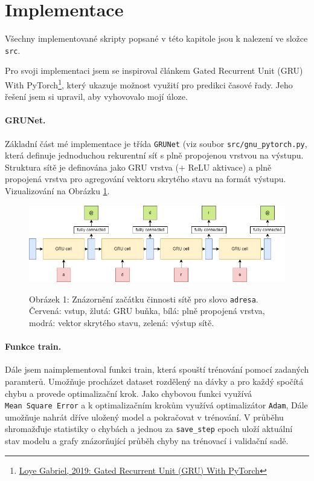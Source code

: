 \documentclass[a4paper]{article}
\theoremstyle{definition}
\begin{document}
\section{Implementace}
Všechny implementované skripty popsané v této kapitole jsou k nalezení ve složce \texttt{src}.

Pro svoji implementaci jsem se inspiroval článkem Gated Recurrent Unit (GRU) With PyTorch\footnote{\href{https://blog.floydhub.com/gru-with-pytorch/}{Loye Gabriel, 2019: Gated Recurrent Unit (GRU) With PyTorch}}, který ukazuje možnost využití pro predikci časové řady. Jeho řešení jsem si upravil, aby vyhovovalo mojí úloze.

\paragraph{GRUNet.}
Základní část mé implementace je třída \texttt{GRUNet} (viz soubor \texttt{src/gnu\_pytorch.py}, která definuje jednoduchou rekurentní síť s plně propojenou vrstvou na výstupu. Struktura sítě je definována jako GRU vrstva (+ ReLU aktivace) a plně propojená vrstva pro agregování vektoru skrytého stavu na formát výstupu. Vizualizování na Obrázku \ref{png:gru_adresa}.

\begin{figure}[t!]
  \centering
  \includegraphics[width=4.5in]{gru_diagram_adresa.png}\\[1pt]  %
  \caption{Obrázek 1: Znázornění začátku činnosti sítě pro slovo \texttt{adresa}.\\Červená: vstup, žlutá: GRU buňka, bílá: plně propojená vrstva, modrá: vektor skrytého stavu, zelená: výstup sítě.}
  \label{png:gru_adresa}
\end{figure}

\paragraph{Funkce train.}
Dále jsem naimplementoval funkci train, která spouští trénování pomocí zadaných paramterů. Umožňuje procházet dataset rozdělený na dávky a pro každý spočítá chybu a provede optimalizační krok. Jako chybovou funkci využívá \texttt{Mean\ Square\ Error} a k optimalizačním krokům využívá optimalizátor \texttt{Adam}, Dále umožňuje nahrát dříve uložený model a pokračovat v trénování. V průběhu shromažďuje statistiky o chybách a jednou za \texttt{save\_step} epoch uloží aktuální stav modelu a grafy znázorňující průběh chyby na trénovací i validační sadě.
\end{document}
